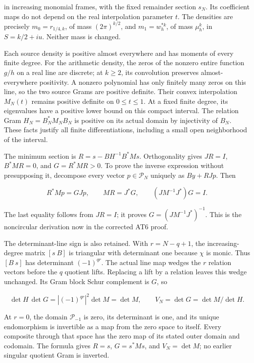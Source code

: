 in increasing monomial frames, with the fixed remainder section \(s_N\). Its coefficient maps do not depend on the real interpolation parameter \(t\). The densities are precisely \(m_0=r_{1/4,k}\), of mass \((2\pi)^{k/2}\), and \(m_1=w_h^{*k}\), of mass \(\mu_h^k\), in \(S=k/2+iu\). Neither mass is changed.

Each source density is positive almost everywhere and has moments of every finite degree. For the arithmetic density, the zeros of the nonzero entire function \(g/h\) on a real line are discrete; at \(k\ge2\), its convolution preserves almost-everywhere positivity. A nonzero polynomial has only finitely many zeros on this line, so the two source Grams are positive definite. Their convex interpolation \(M_N(t)\) remains positive definite on \(0\le t\le1\). At a fixed finite degree, its eigenvalues have a positive lower bound on this compact interval. The relation Gram \(H_N=B_N^*M_NB_N\) is positive on its actual domain by injectivity of \(B_N\). These facts justify all finite differentiations, including a small open neighborhood of the interval.

The minimum section is \(R=s-BH^{-1}B^*Ms\). Orthogonality gives \(JR=I\), \(B^*MR=0\), and \(G=R^*MR>0\). To prove the inverse expression without presupposing it, decompose every vector \(p\in\mathcal P_N\) uniquely as \(By+RJp\). Then

\[
R^*Mp=GJp,\qquad MR=J^*G,\qquad
(JM^{-1}J^*)G=I.
\tag{RV7}
\]

The last equality follows from \(JR=I\); it proves \(G=(JM^{-1}J^*)^{-1}\). This is the noncircular derivation now in the corrected AT6 proof.

The determinant-line sign is also retained. With \(r=N-q+1\), the increasing-degree matrix \([s\ B]\) is triangular with determinant one because \(\chi\) is monic. Thus \([B\ s]\) has determinant \((-1)^{qr}\). The actual line map wedges the \(r\) relation vectors before the \(q\) quotient lifts. Replacing a lift by a relation leaves this wedge unchanged. Its Gram block Schur complement is \(G\), so

\[
\det H\,\det G
=|(-1)^{qr}|^2\det M=\det M,\qquad
V_N=\det G=\det M/\det H.
\tag{RV8}
\]

At \(r=0\), the domain \(\mathcal P_{-1}\) is zero, its determinant is one, and its unique endomorphism is invertible as a map from the zero space to itself. Every composite through that space has the zero map of its stated outer domain and codomain. The formula gives \(R=s\), \(G=s^*Ms\), and \(V_N=\det M\); no earlier singular quotient Gram is inverted.

